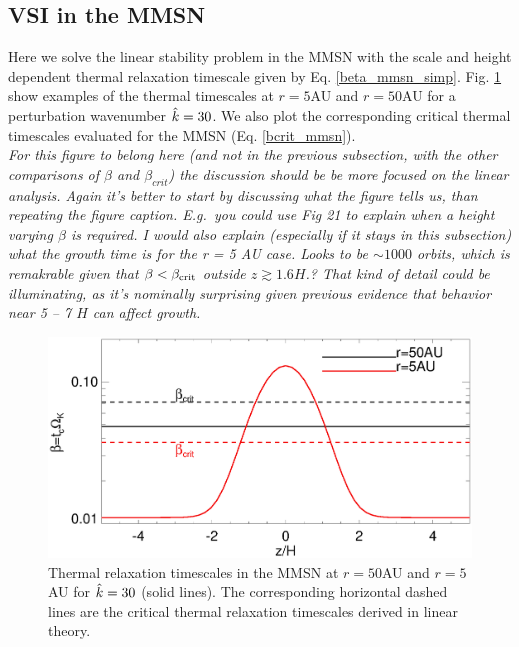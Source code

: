 \subsection{VSI in the MMSN}
Here we solve the linear stability problem in the MMSN with the scale and
height dependent thermal relaxation timescale given by
Eq. \ref{beta_mmsn_simp}. 
 Fig. \ref{beta_compare} show examples of
the thermal timescales at $r=5$AU and $r=50$AU for a
perturbation wavenumber $\hat{k}=30$. We also plot the 
corresponding critical thermal timescales evaluated for the MMSN
(Eq. \ref{bcrit_mmsn}).  \\
\emph{For this figure to belong here (and not in the previous subsection, with the other comparisons of $\beta$ and $\beta_{crit}$) the discussion should be be more focused on the linear analysis.  Again it's better to start by discussing what the figure tells us, than repeating the figure caption. E.g.\ you could use Fig 21 to explain when a height varying $\beta$ is required.  I would also explain (especially if it stays in this subsection) what the growth time is for the r = 5 AU case.  Looks to be $\sim 1000$ orbits, which is remakrable given that $\beta < \beta_{\rm crit}$ outside $z \gtrsim  1.6 H$.?  That kind of detail could be illuminating, as it's nominally surprising given previous evidence that behavior near 5 -- 7 $H$ can affect growth.}

 \begin{figure}
  \includegraphics[width=\linewidth,clip=true,trim=0cm 0cm 0cm
  0cm]{figures/beta_compare}
  \caption{Thermal relaxation timescales in the MMSN at $r=50$AU
    and $r=5$AU for $\hat{k}=30$ (solid lines). The
    corresponding horizontal dashed lines are the critical thermal
    relaxation timescales derived in linear theory. 
    \label{beta_compare}}
\end{figure}

